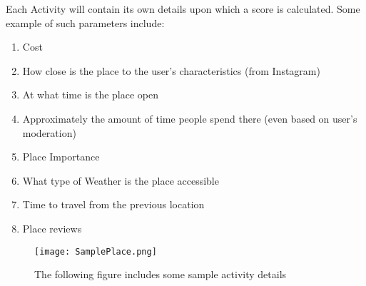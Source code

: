         Each Activity will contain its own details upon which a
        score is calculated. Some example of such parameters include:
        \begin{enumerate}
            \item Cost
            \item How close is the place to the user’s characteristics (from Instagram)
            \item At what time is the place open
            \item Approximately the amount of time people spend there (even based on user’s moderation)
            \item Place Importance
            \item What type of Weather is the place accessible
            \item Time to travel from the previous location
            \item Place reviews
            
        \end{enumerate}

        \begin{figure}[H]
            \caption{The following figure includes some sample activity details}
            \centering
            \texttt{[image: SamplePlace.png]}
            \label{dataset}
        \end{figure}

